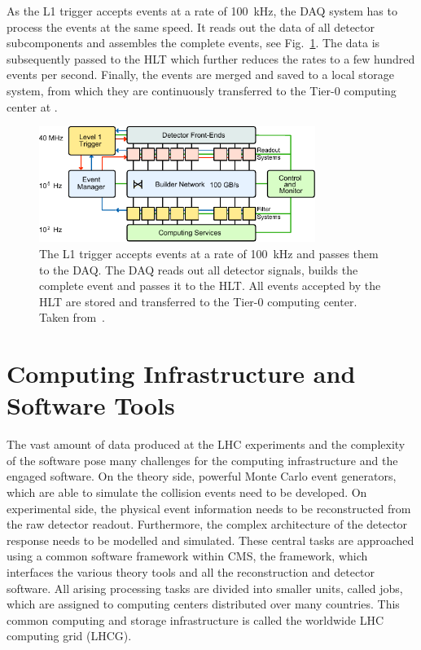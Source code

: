As the L1 trigger accepts events at a rate of \SI{100}{\kilo\hertz}, the DAQ
system has to process the events at the same speed. It reads out the data of all
detector subcomponents and assembles the complete events, see
Fig.~\ref{fig:cms:daq_system}. The data is subsequently passed to the HLT  which
further reduces the rates to a few hundred events per second. Finally, the events are
merged and saved to a local storage system, from which they are continuously
transferred to the Tier-0 computing center at \CERN.

\begin{figure}[h!tp]
    \centering
    \includegraphics[width=0.8\textwidth]{figures/experimental_setup/cms_daq_new.pdf}\hfill
    \caption[The DAQ System of CMS]{The L1 trigger accepts events at a rate of
        \SI{100}{\kilo\hertz} and passes them to the DAQ. The DAQ reads out
        all detector signals, builds the complete event and passes it to the
        HLT. All events accepted by the HLT are stored and transferred to the
        Tier-0 computing center. Taken from~\cite{Bayatian:922757}.}
    \label{fig:cms:daq_system}
\end{figure}

\section{Computing Infrastructure and Software Tools}

The vast amount of data produced at the LHC experiments and the complexity of
the software pose many challenges for the computing infrastructure and the
engaged software. On the theory side, powerful Monte Carlo event generators,
which are able to simulate the collision events need to be developed. On
experimental side, the physical event information needs to be reconstructed from
the raw detector readout. Furthermore, the complex architecture of the detector
response needs to be modelled and simulated. These central tasks are approached
using a common software framework within CMS, the \CMSSW framework, which
interfaces the various theory tools and all the reconstruction and detector
software. All arising processing tasks are divided into smaller units, called
jobs, which are assigned to computing centers distributed over many countries.
This common computing and storage infrastructure is called the worldwide LHC
computing grid (LHCG).

